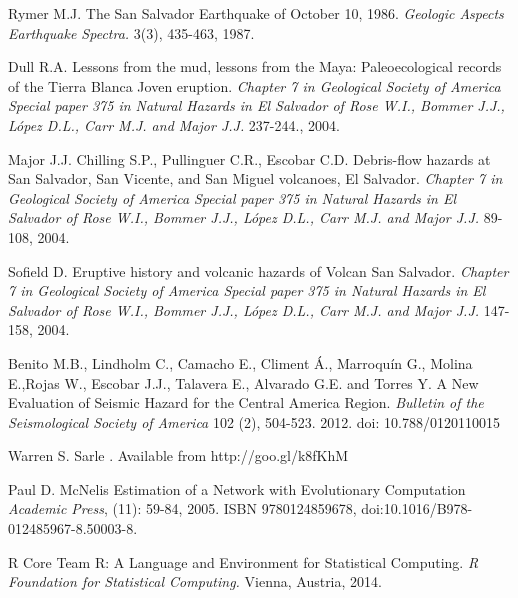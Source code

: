 \documentclass[11pt,twoside]{rmta2010eng}%
\begin{document}
\begin{thebibliography}{99}
Rymer M.J. 
\newblock The San Salvador Earthquake of October 10, 1986.
\newblock \emph{Geologic Aspects Earthquake Spectra.}
 3(3), 435-463, 1987.


Dull R.A.
\newblock Lessons from the mud, lessons from the Maya: Paleoecological records of the Tierra Blanca Joven eruption.
\newblock \emph{Chapter 7 in Geological Society of America Special paper 375 in Natural Hazards in El Salvador of Rose W.I., Bommer J.J., L\'{o}pez D.L., Carr M.J. and Major J.J.}
 237-244., 2004.

Major J.J. Chilling S.P., Pullinguer C.R., Escobar C.D.
\newblock Debris-flow hazards at San Salvador, San Vicente, and San Miguel volcanoes, El Salvador.
\newblock \emph{Chapter 7 in Geological Society of America Special paper 375 in Natural Hazards in El Salvador of Rose W.I., Bommer J.J., L\'{o}pez D.L., Carr M.J. and Major J.J.}
 89-108, 2004.


Sofield D.
\newblock Eruptive history and volcanic hazards of Volcan San Salvador. 
\newblock \emph{Chapter 7 in Geological Society of America Special paper 375 in Natural Hazards in El Salvador of Rose W.I., Bommer J.J., L\'{o}pez D.L., Carr M.J. and Major J.J.}
 147-158, 2004.



Benito M.B., Lindholm C., Camacho E., Climent \'{A}., Marroqu\'{i}n G., Molina E.,Rojas W., Escobar J.J., Talavera E., Alvarado G.E. and Torres Y.
\newblock A New Evaluation of Seismic Hazard for the Central America Region. 
\newblock \emph{Bulletin of the Seismological Society of America}
 102 (2), 504-523. 2012.
\newblock  doi: 10.788/0120110015



Warren S. Sarle
. Available from http://goo.gl/k8fKhM



Paul D. McNelis
\newblock Estimation of a Network with Evolutionary Computation
\newblock \emph{Academic Press},
  (11): 59-84, 2005.
\newblock ISBN 9780124859678,
\newblock doi:10.1016/B978-012485967-8.50003-8.


R Core Team
\newblock R: A Language and Environment for Statistical Computing.
\newblock \emph{R Foundation for Statistical Computing.}
 Vienna, Austria, 2014.




\end{thebibliography}
\end{document}
